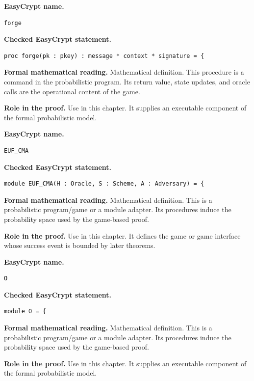 \begin{formaldefinition}
\noindent\textbf{EasyCrypt name.}
\begin{lstlisting}[language=EasyCrypt,basicstyle=\ttfamily\scriptsize]
forge
\end{lstlisting}
\noindent\textbf{Checked EasyCrypt statement.}
\begin{lstlisting}[language=EasyCrypt,basicstyle=\ttfamily\scriptsize]
proc forge(pk : pkey) : message * context * signature = {
\end{lstlisting}
\noindent\textbf{Formal mathematical reading.}
Mathematical definition. This procedure is a command in the probabilistic program.  Its return value, state updates, and oracle calls are the operational content of the game.

\noindent\textbf{Role in the proof.}
Use in this chapter. It supplies an executable component of the formal probabilistic model.

\end{formaldefinition}

\begin{formaldefinition}
\noindent\textbf{EasyCrypt name.}
\begin{lstlisting}[language=EasyCrypt,basicstyle=\ttfamily\scriptsize]
EUF_CMA
\end{lstlisting}
\noindent\textbf{Checked EasyCrypt statement.}
\begin{lstlisting}[language=EasyCrypt,basicstyle=\ttfamily\scriptsize]
module EUF_CMA(H : Oracle, S : Scheme, A : Adversary) = {
\end{lstlisting}
\noindent\textbf{Formal mathematical reading.}
Mathematical definition. This is a probabilistic program/game or a module adapter.  Its procedures induce the probability space used by the game-based proof.

\noindent\textbf{Role in the proof.}
Use in this chapter. It defines the game or game interface whose success event is bounded by later theorems.

\end{formaldefinition}

\begin{formaldefinition}
\noindent\textbf{EasyCrypt name.}
\begin{lstlisting}[language=EasyCrypt,basicstyle=\ttfamily\scriptsize]
O
\end{lstlisting}
\noindent\textbf{Checked EasyCrypt statement.}
\begin{lstlisting}[language=EasyCrypt,basicstyle=\ttfamily\scriptsize]
module O = {
\end{lstlisting}
\noindent\textbf{Formal mathematical reading.}
Mathematical definition. This is a probabilistic program/game or a module adapter.  Its procedures induce the probability space used by the game-based proof.

\noindent\textbf{Role in the proof.}
Use in this chapter. It supplies an executable component of the formal probabilistic model.

\end{formaldefinition}

